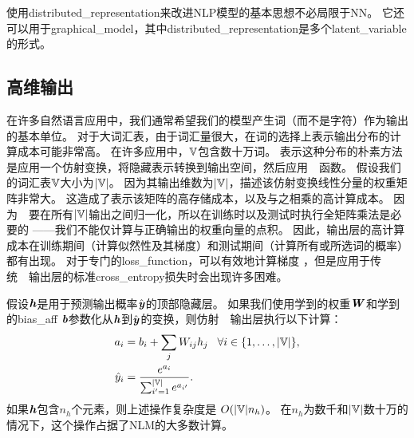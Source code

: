 
使用\gls{distributed_representation}来改进\gls{NLP}模型的基本思想不必局限于\gls{NN}。
它还可以用于\gls{graphical_model}，其中\gls{distributed_representation}是多个\gls{latent_variable}的形式\citep{Mnih+Hinton-2007}。

\subsection{高维输出}
\label{sec:high_dimensional_outputs}

在许多自然语言应用中，我们通常希望我们的模型产生词（而不是字符）作为输出的基本单位。
对于大词汇表，由于词汇量很大，在词的选择上表示输出分布的计算成本可能非常高。
在许多应用中，$\mathbb{V}$包含数十万词。
表示这种分布的朴素方法是应用一个仿射变换，将隐藏表示转换到输出空间，然后应用~~函数。
假设我们的词汇表$\mathbb{V}$大小为$| \mathbb{V} |$。
因为其输出维数为$| \mathbb{V} |$，描述该仿射变换线性分量的权重矩阵非常大。
这造成了表示该矩阵的高存储成本，以及与之相乘的高计算成本。
因为~~要在所有$| \mathbb{V} |$输出之间归一化，所以在训练时以及测试时执行全矩阵乘法是必要的 ——我们不能仅计算与正确输出的权重向量的点积。
因此，输出层的高计算成本在训练期间（计算似然性及其梯度）和测试期间（计算所有或所选词的概率）都有出现。
对于专门的\gls{loss_function}，可以有效地计算梯度 \citep{Vincent2015}，但是应用于传统~~输出层的标准\gls{cross_entropy}损失时会出现许多困难。

假设$\boldsymbol{\mathit{h}}$是用于预测输出概率$\hat {\boldsymbol{\mathit{y}}}$的顶部隐藏层。
如果我们使用学到的权重$\boldsymbol{\mathit{W}}$和学到的\gls{bias_aff} $\boldsymbol{\mathit{b}}$参数化从$\boldsymbol{\mathit{h}}$到$\hat {\boldsymbol{\mathit{y}}}$的变换，则仿射~~输出层执行以下计算：
\begin{align}
\label{eq:softmax-over-words}
  a_i &= b_i + \sum_j  W_{ij} h_j \;\;\; \forall i \in \{1,\ldots,|\mathbb{V}|\}, \\
  \hat{y}_i &= \frac{e^{a_i}}{\sum_{i'=1}^{|\mathbb{V}|} e^{a_{i'}}}.
\end{align}
如果$\boldsymbol{\mathit{h}}$包含$n_h$个元素，则上述操作复杂度是 $O(|\mathbb{V}| n_h)$。
在$n_h$为数千和$| \mathbb{V} |$数十万的情况下，这个操作占据了\gls{NLM}的大多数计算。


